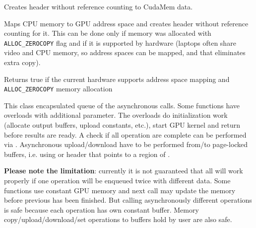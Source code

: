 Creates  header without reference counting to CudaMem data.


Maps CPU memory to GPU address space and creates  header without reference counting for it. This can be done only if memory was allocated with \texttt{ALLOC\_ZEROCOPY} flag and if it is supported by hardware (laptops often share video and CPU memory, so address spaces can be mapped, and that eliminates extra copy).


Returns true if the current hardware supports address space mapping and \texttt{ALLOC\_ZEROCOPY} memory allocation




This class encapsulated queue of the asynchronous calls. Some functions have overloads with additional  parameter. The overloads do initialization work (allocate output buffers, upload constants, etc.), start GPU kernel and return before results are ready. A check if all operation are complete can be performed via .  Asynchronous upload/download have to be performed from/to page-locked buffers, i.e. using  or  header that points to a region of .

\textbf{Please note the limitation}: currently it is not guaranteed that all will work properly if one operation will be enqueued twice with different data. Some functions use constant GPU memory and next call may update the memory before previous has been finished. But calling asynchronously different operations is safe because each operation has own constant buffer. Memory copy/upload/download/set operations to buffers hold by user are also safe.

